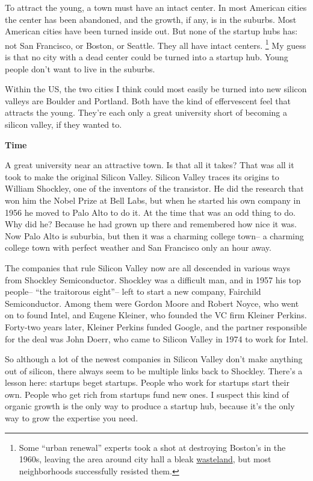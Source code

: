 To attract the young, a town must have an intact center. In most
American cities the center has been abandoned, and the growth, if any,
is in the suburbs. Most American cities have been turned inside out. But
none of the startup hubs has: not San Francisco, or Boston, or Seattle.
They all have intact centers. \footnote{Some ``urban renewal'' experts took a shot at destroying
Boston's in the 1960s, leaving the area around city hall a bleak
\href{http://www.pps.org/great_public_spaces/one?public_place_id=148}{wasteland},
but most neighborhoods successfully resisted them.} My guess is that
no city with a dead center could be turned into a startup hub. Young
people don't want to live in the suburbs.

Within the US, the two cities I think could most easily be turned into
new silicon valleys are Boulder and Portland. Both have the kind of
effervescent feel that attracts the young. They're each only a great
university short of becoming a silicon valley, if they wanted to.

\textbf{Time}

A great university near an attractive town. Is that all it takes? That
was all it took to make the original Silicon Valley. Silicon Valley
traces its origins to William Shockley, one of the inventors of the
transistor. He did the research that won him the Nobel Prize at Bell
Labs, but when he started his own company in 1956 he moved to Palo Alto
to do it. At the time that was an odd thing to do. Why did he? Because
he had grown up there and remembered how nice it was. Now Palo Alto is
suburbia, but then it was a charming college town-- a charming college
town with perfect weather and San Francisco only an hour away.

The companies that rule Silicon Valley now are all descended in various
ways from Shockley Semiconductor. Shockley was a difficult man, and in
1957 his top people-- ``the traitorous eight''-- left to start a new
company, Fairchild Semiconductor. Among them were Gordon Moore and
Robert Noyce, who went on to found Intel, and Eugene Kleiner, who
founded the VC firm Kleiner Perkins. Forty-two years later, Kleiner
Perkins funded Google, and the partner responsible for the deal was John
Doerr, who came to Silicon Valley in 1974 to work for Intel.

So although a lot of the newest companies in Silicon Valley don't make
anything out of silicon, there always seem to be multiple links back to
Shockley. There's a lesson here: startups beget startups. People who
work for startups start their own. People who get rich from startups
fund new ones. I suspect this kind of organic growth is the only way to
produce a startup hub, because it's the only way to grow the expertise
you need.


